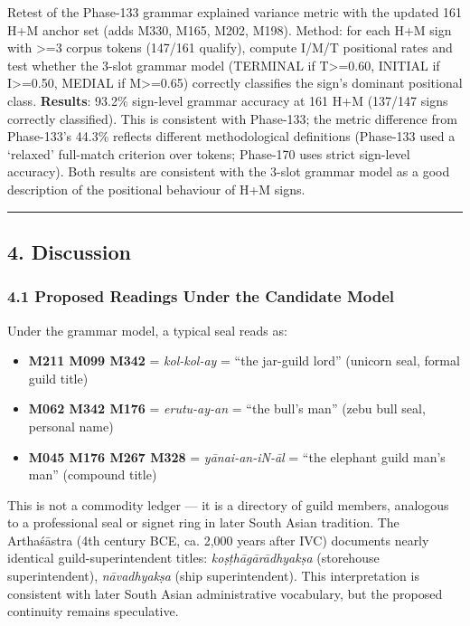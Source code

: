 \documentclass[
]{article}
\providecommand{\tightlist}{%
  \setlength{\itemsep}{0pt}\setlength{\parskip}{0pt}}
\begin{document}
Retest of the Phase-133 grammar explained variance metric with the
updated 161 H+M anchor set (adds M330, M165, M202, M198). Method:
for each H+M sign with \textgreater{}=3 corpus tokens (147/161 qualify), compute
I/M/T positional rates and test whether the 3-slot grammar model
(TERMINAL if T\textgreater{}=0.60, INITIAL if I\textgreater{}=0.50, MEDIAL if M\textgreater{}=0.65)
correctly classifies the sign's dominant positional class.
\textbf{Results}: 93.2\% sign-level grammar accuracy at 161 H+M
(137/147 signs correctly classified). This is consistent with Phase-133;
the metric difference from Phase-133's 44.3\% reflects different
methodological definitions (Phase-133 used a `relaxed' full-match
criterion over tokens; Phase-170 uses strict sign-level accuracy).
Both results are consistent with the 3-slot grammar model as a good description of the positional behaviour of H+M signs.


\begin{center}\rule{0.5\linewidth}{0.5pt}\end{center}

\subsection{4. Discussion}\label{discussion}

\subsubsection{4.1 Proposed Readings Under the Candidate Model}\label{proposed-readings-candidate-model}

Under the grammar model, a typical seal reads as:

\begin{itemize}
\tightlist
\item
  \textbf{M211 M099 M342} = \emph{kol-kol-ay} = ``the jar-guild lord''
  (unicorn seal, formal guild title)
\item
  \textbf{M062 M342 M176} = \emph{erutu-ay-an} = ``the bull's man''
  (zebu bull seal, personal name)
\item
  \textbf{M045 M176 M267 M328} = \emph{yānai-an-iN-āl} = ``the elephant
  guild man's man'' (compound title)
\end{itemize}

This is not a commodity ledger --- it is a directory of guild members,
analogous to a professional seal or signet ring in later South Asian
tradition. The Arthaśāstra (4th century BCE, ca. 2,000 years after IVC)
documents nearly identical guild-superintendent titles:
\emph{koṣṭhāgārādhyakṣa} (storehouse superintendent), \emph{nāvadhyakṣa}
(ship superintendent). This interpretation is consistent with later South Asian administrative vocabulary, but the proposed continuity remains speculative.
\end{document}
